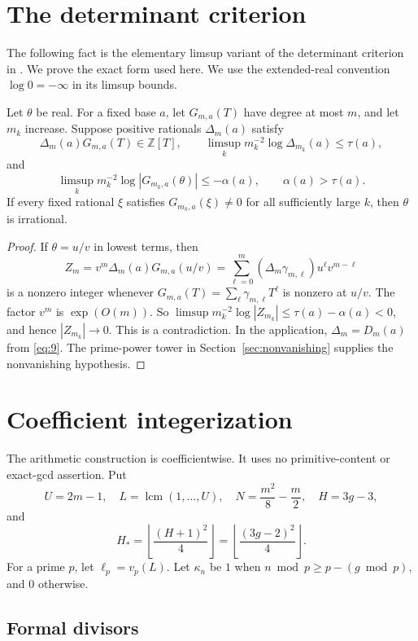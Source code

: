 \section{The determinant criterion}\label{sec:criterion}

The following fact is the elementary limsup variant of the determinant
criterion in \cite[Sec.~3]{Zh}. We prove the exact form used here.
We use the extended-real convention $\log 0=-\infty$ in its limsup bounds.

\begin{fact}\label{fact:criterion}
Let $\theta$ be real. For a fixed base $a$, let $G_{m,a}(T)$ have degree at
most $m$, and let $m_k$ increase. Suppose positive rationals $\Delta_m(a)$
satisfy
\[
 \Delta_m(a)G_{m,a}(T)\in\mathbb Z[T],\qquad
 \limsup_k m_k^{-2}\log\Delta_{m_k}(a)\le\tau(a),
\]
and
\[
 \limsup_k m_k^{-2}\log|G_{m_k,a}(\theta)|\le-\alpha(a),
 \qquad \alpha(a)>\tau(a).
\]
If every fixed rational $\xi$ satisfies
$G_{m_k,a}(\xi)\ne0$ for all sufficiently large $k$, then $\theta$ is
irrational.
\end{fact}

\begin{proof}
If $\theta=u/v$ in lowest terms, then
\[
 Z_m=v^m\Delta_m(a)G_{m,a}(u/v)
   =\sum_{\ell=0}^m(\Delta_m\gamma_{m,\ell})u^\ell v^{m-\ell}
\]
is a nonzero integer whenever
$G_{m,a}(T)=\sum_\ell\gamma_{m,\ell}T^\ell$ is nonzero at $u/v$.
The factor $v^m$ is $\exp(O(m))$. So
$\limsup m_k^{-2}\log|Z_{m_k}|\le\tau(a)-\alpha(a)<0$, and hence
$|Z_{m_k}|\to0$. This is a contradiction. In the application,
$\Delta_m=D_m(a)$ from \eqref{eq:9}. The prime-power tower in
Section~\ref{sec:nonvanishing} supplies the nonvanishing hypothesis.
\qedhere
\end{proof}

\section{Coefficient integerization}\label{sec:arithmetic}

The arithmetic construction is coefficientwise. It uses no primitive-content
or exact-gcd assertion. Put
\[
 U=2m-1,\quad L=\operatorname{lcm}(1,\ldots,U),\quad
 N=\frac{m^2}{8}-\frac m2,\quad H=3g-3,
\]
and
\[
 H_*=\left\lfloor\frac{(H+1)^2}{4}\right\rfloor
     =\left\lfloor\frac{(3g-2)^2}{4}\right\rfloor .
\]
For a prime $p$, let $\ell_p=v_p(L)$. Let
$\kappa_n$ be $1$ when
$n\bmod p\ge p-(g\bmod p)$, and $0$ otherwise.

\subsection{Formal divisors}

